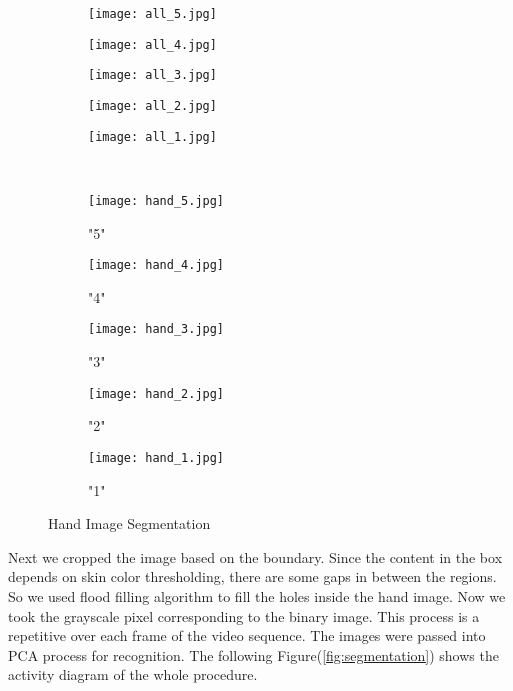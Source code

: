 \documentclass[12pt]{report}
\begin{document}
\begin{figure}
\centering
\begin{subfigure}{.18\textwidth}
  \centering
  \texttt{[image: all\_5.jpg]}
  \label{fig:sb1}
\end{subfigure}%
\begin{subfigure}{.18\textwidth}
  \centering
  \texttt{[image: all\_4.jpg]}
  \label{fig:sb2}
\end{subfigure}
\begin{subfigure}{.18\textwidth}
  \centering
  \texttt{[image: all\_3.jpg]}
  \label{fig:sb3}
\end{subfigure}
\begin{subfigure}{.18\textwidth}
  \centering
  \texttt{[image: all\_2.jpg]}
  \label{fig:sb4}
\end{subfigure}
\begin{subfigure}{.18\textwidth}
  \centering
  \texttt{[image: all\_1.jpg]}
\end{subfigure}
\\
\begin{subfigure}{.18\textwidth}
  \centering
  \texttt{[image: hand\_5.jpg]}
  \caption{"5"}
  \label{fig:s1}
\end{subfigure}%
\begin{subfigure}{.18\textwidth}
  \centering
  \texttt{[image: hand\_4.jpg]}
  \caption{"4"}
  \label{fig:s2}
\end{subfigure}
\begin{subfigure}{.18\textwidth}
  \centering
  \texttt{[image: hand\_3.jpg]}
  \caption{"3"}
  \label{fig:s3}
\end{subfigure}
\begin{subfigure}{.18\textwidth}
  \centering
  \texttt{[image: hand\_2.jpg]}
  \caption{"2"}
  \label{fig:s4}
\end{subfigure}
\begin{subfigure}{.18\textwidth}
  \centering
  \texttt{[image: hand\_1.jpg]}
  \caption{"1"}
  \label{fig:s5}
\end{subfigure}
\caption{Hand Image Segmentation}
\label{fig:Binaryimg}
\end{figure}
Next we cropped the image based on the boundary. Since the content in the box depends on skin color thresholding, there are some gaps in between the regions. So we used flood filling algorithm to fill the holes inside the hand image. Now we took the grayscale pixel corresponding to the binary image. This process is a repetitive over each frame of the video sequence. The images were passed into PCA process for recognition. The following Figure(\ref{fig:segmentation}) shows the activity diagram of the whole procedure.
\end{document}
